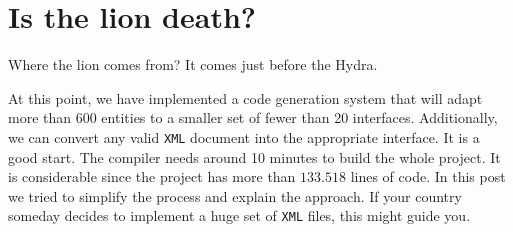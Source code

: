 \documentclass{article}
\begin{document}



\section{Is the lion death?}

Where the lion comes from? It comes just before the Hydra.

At this point, we have implemented a code generation system that will adapt more than 600 entities to a smaller set of fewer than 20 interfaces. Additionally, we can convert any valid \texttt{XML} document into the appropriate interface. It is a good start. The compiler needs around 10 minutes to build the whole project. It is considerable since the project has more than $133.518$ lines of code. In this post we tried to simplify the process and explain the approach. If your country someday decides to implement a huge set of \texttt{XML} files, this might guide you.


\medskip

\end{document}
